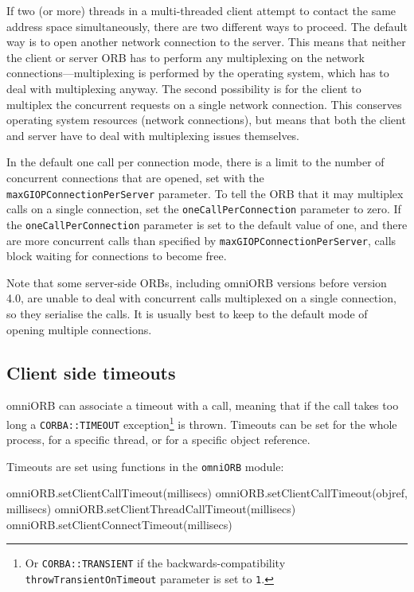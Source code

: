 \documentclass[11pt,oneside,a4paper]{book}
\newcommand{\code}[1]{\texttt{#1}}
\newcommand{\dsc}{\discretionary{}{}{}}
\begin{document}
If two (or more) threads in a multi-threaded client attempt to contact
the same address space simultaneously, there are two different ways to
proceed. The default way is to open another network connection to the
server. This means that neither the client or server ORB has to
perform any multiplexing on the network connections---multiplexing is
performed by the operating system, which has to deal with multiplexing
anyway. The second possibility is for the client to multiplex the
concurrent requests on a single network connection. This conserves
operating system resources (network connections), but means that both
the client and server have to deal with multiplexing issues
themselves.

In the default one call per connection mode, there is a limit to the
number of concurrent connections that are opened, set with the
\code{maxGIOPConnection\dsc{}PerServer} parameter. To tell the ORB
that it may multiplex calls on a single connection, set the
\code{oneCallPerConnection} parameter to zero. If the
\code{oneCallPer\dsc{}Connection} parameter is set to the default
value of one, and there are more concurrent calls than specified by
\code{maxGIOPConnectionPerServer}, calls block waiting for connections
to become free.

Note that some server-side ORBs, including omniORB versions before
version 4.0, are unable to deal with concurrent calls multiplexed on a
single connection, so they serialise the calls. It is usually best to
keep to the default mode of opening multiple connections.


\subsection{Client side timeouts}
\label{sec:timeoutAPI}

omniORB can associate a timeout with a call, meaning that if the call
takes too long a \code{CORBA::TIMEOUT} exception\footnote{Or
  \code{CORBA::TRANSIENT} if the backwards-compatibility
  \code{throwTransientOnTimeout} parameter is set to \code{1}.} is
thrown. Timeouts can be set for the whole process, for a specific
thread, or for a specific object reference.

Timeouts are set using functions in the \code{omniORB} module:

\begin{pylisting}
omniORB.setClientCallTimeout(millisecs)
omniORB.setClientCallTimeout(objref, millisecs)
omniORB.setClientThreadCallTimeout(millisecs)
omniORB.setClientConnectTimeout(millisecs)
\end{pylisting}
\end{document}
